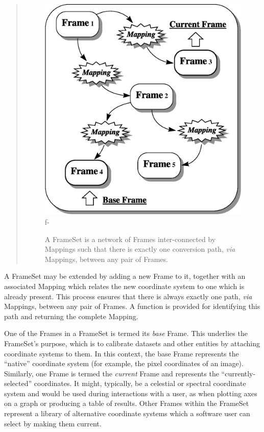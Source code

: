 \documentclass[twoside,11pt]{article}
\begin{document}
\begin{htmlonly}
\begin{quote}
\begin{figure}
   \includegraphics[scale=1.0]{sun210_figures/frameset.eps}
f-
   \caption{A FrameSet is a network of Frames inter-connected by Mappings
   such that there is exactly one conversion path, {\em{via}} Mappings,
   between any pair of Frames.}
   \end{figure}
   \end{quote}
\end{htmlonly}
A FrameSet may be extended by adding a new Frame to it, together with
an associated Mapping which relates the new coordinate system to one
which is already present.  This process ensures that there is always
exactly one path, {\em{via}} Mappings, between any pair of Frames.  A
function is provided for identifying this path and returning the
complete Mapping.

One of the Frames in a FrameSet is termed its {\em{base}} Frame.  This
underlies the FrameSet's purpose, which is to calibrate datasets and
other entities by attaching coordinate systems to them.  In this
context, the base Frame represents the ``native'' coordinate system
(for example, the pixel coordinates of an image).  Similarly, one
Frame is termed the {\em{current}} Frame and represents the
``currently-selected'' coordinates.  It might, typically, be a
celestial or spectral coordinate system and would be used during
interactions with
a user, as when plotting axes on a graph or producing a table of
results.  Other Frames within the FrameSet represent a library of
alternative coordinate systems which a software user can select by
making them current.
\end{document}
